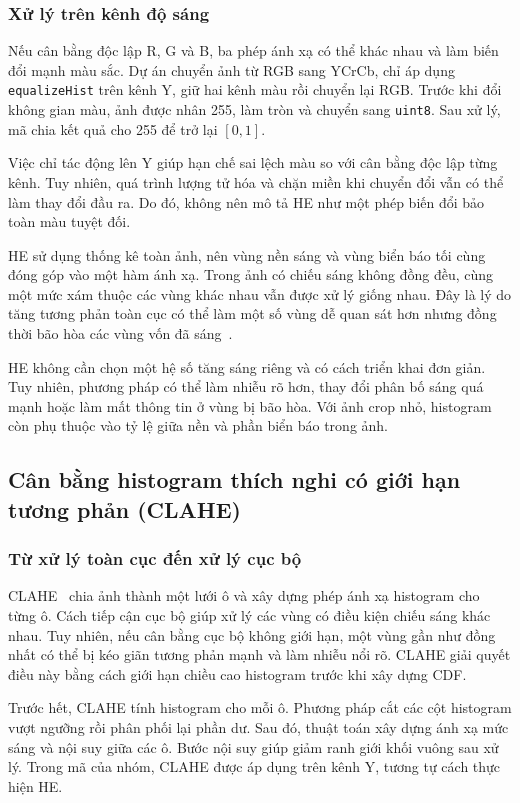 \subsubsection{Xử lý trên kênh độ sáng}
Nếu cân bằng độc lập R, G và B, ba phép ánh xạ có thể khác nhau và làm biến đổi mạnh màu sắc. Dự án chuyển ảnh từ RGB sang YCrCb, chỉ áp dụng \texttt{equalizeHist} trên kênh Y, giữ hai kênh màu rồi chuyển lại RGB. Trước khi đổi không gian màu, ảnh được nhân 255, làm tròn và chuyển sang \texttt{uint8}. Sau xử lý, mã chia kết quả cho 255 để trở lại $[0,1]$.

Việc chỉ tác động lên Y giúp hạn chế sai lệch màu so với cân bằng độc lập từng kênh. Tuy nhiên, quá trình lượng tử hóa và chặn miền khi chuyển đổi vẫn có thể làm thay đổi đầu ra. Do đó, không nên mô tả HE như một phép biến đổi bảo toàn màu tuyệt đối.

HE sử dụng thống kê toàn ảnh, nên vùng nền sáng và vùng biển báo tối cùng đóng góp vào một hàm ánh xạ. Trong ảnh có chiếu sáng không đồng đều, cùng một mức xám thuộc các vùng khác nhau vẫn được xử lý giống nhau. Đây là lý do tăng tương phản toàn cục có thể làm một số vùng dễ quan sát hơn nhưng đồng thời bão hòa các vùng vốn đã sáng~\cite{opencv}.

HE không cần chọn một hệ số tăng sáng riêng và có cách triển khai đơn giản. Tuy nhiên, phương pháp có thể làm nhiễu rõ hơn, thay đổi phân bố sáng quá mạnh hoặc làm mất thông tin ở vùng bị bão hòa. Với ảnh crop nhỏ, histogram còn phụ thuộc vào tỷ lệ giữa nền và phần biển báo trong ảnh.

\subsection{Cân bằng histogram thích nghi có giới hạn tương phản (CLAHE)}
\subsubsection{Từ xử lý toàn cục đến xử lý cục bộ}
CLAHE~\cite{clahe_original} chia ảnh thành một lưới ô và xây dựng phép ánh xạ histogram cho từng ô. Cách tiếp cận cục bộ giúp xử lý các vùng có điều kiện chiếu sáng khác nhau. Tuy nhiên, nếu cân bằng cục bộ không giới hạn, một vùng gần như đồng nhất có thể bị kéo giãn tương phản mạnh và làm nhiễu nổi rõ. CLAHE giải quyết điều này bằng cách giới hạn chiều cao histogram trước khi xây dựng CDF.

Trước hết, CLAHE tính histogram cho mỗi ô. Phương pháp cắt các cột histogram vượt ngưỡng rồi phân phối lại phần dư. Sau đó, thuật toán xây dựng ánh xạ mức sáng và nội suy giữa các ô. Bước nội suy giúp giảm ranh giới khối vuông sau xử lý. Trong mã của nhóm, CLAHE được áp dụng trên kênh Y, tương tự cách thực hiện HE.

